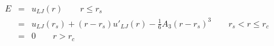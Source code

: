


\begin{eqnarray*}
 E &=& u_{LJ}(r) \qquad r \leq r_s \\
    &=&  u_{LJ}(r_s) + (r-r_s) u'_{LJ}(r) - \frac{1}{6} A_3 (r-r_s)^3 \qquad r_s < r \leq r_c \\
    &=& 0 \qquad r > r_c 
\end{eqnarray*}                           



